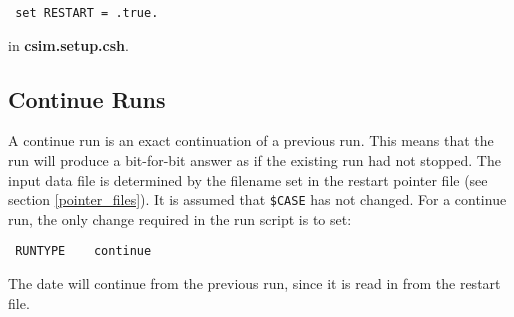\begin{verbatim} set RESTART = .true.  \end{verbatim}

{\noindent in {\bf csim.setup.csh}.}

\subsection{Continue Runs}
\label{continue_runs}

A continue run is an exact continuation of a previous run. This means
that the run will produce a bit-for-bit answer as if the existing run
had not stopped.  The input data file is determined by the filename set
in the restart pointer file (see section \ref{pointer_files}).
It is assumed that {\tt \$CASE} has not changed. For a continue run,
the only change required in the run script is to set:

\begin{verbatim} RUNTYPE    continue \end{verbatim}

The date will continue from the previous run, since it is read in from the
restart file.


